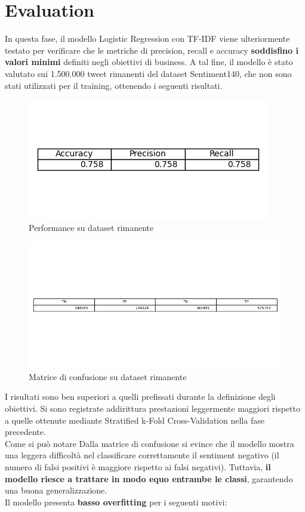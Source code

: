\documentclass[12pt,a4paper]{report} %
\begin{document}
\chapter{Evaluation}
In questa fase, il modello Logistic Regression con TF-IDF viene ulteriormente testato per verificare che le metriche di precision, recall e accuracy \textbf{soddisfino i valori minimi} definiti negli obiettivi di business. A tal fine, il modello è stato valutato sui 1.500.000 tweet rimanenti del dataset Sentiment140, che non sono stati utilizzati per il training, ottenendo i seguenti risultati.
\begin{figure}[H]
    \centering
    \includegraphics[width=0.75\linewidth]{immagini_modeling/performance_rim.png}
    \caption{Performance su dataset rimanente}
    \label{fig:enter-label}
\end{figure}
\begin{figure}[H]
    \centering
    \includegraphics[width=1\linewidth]{immagini_modeling/matr_rimanente.png}
    \caption{Matrice di confusione su dataset rimanente}
    \label{fig:enter-label}
\end{figure}
I risultati sono ben superiori a quelli prefissati durante la definizione degli obiettivi. Si sono registrate addirittura prestazioni leggermente maggiori rispetto a quelle ottenute mediante Stratified k-Fold Cross-Validation nella fase precedente. \\Come si può notare Dalla matrice di confusione si evince che il modello mostra una leggera difficoltà nel classificare correttamente il sentiment negativo (il numero di falsi positivi è maggiore rispetto ai falsi negativi). Tuttavia, \textbf{il modello riesce a trattare in modo equo entrambe le classi}, garantendo una buona generalizzazione. \\ Il modello presenta \textbf{basso overfitting} per i seguenti motivi:
\end{document}
